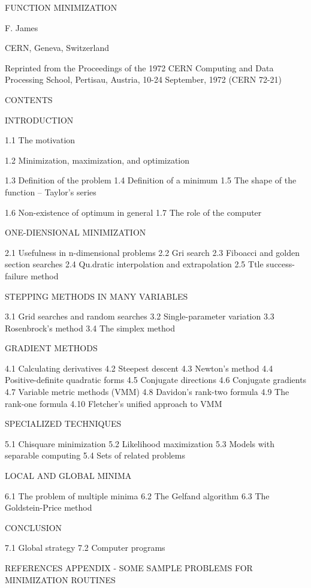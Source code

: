  
                FUNCTION MINIMIZATION
 
 
 
                      F. James
 
              CERN, Geneva, Switzerland
 
 
        Reprinted from the Proceedings of the
   1972 CERN Computing and Data Processing School,
Pertisau, Austria, 10-24 September, 1972 (CERN 72-21)
 
 
                            CONTENTS
 
INTRODUCTION
 
1.1  The motivation
 
1.2  Minimization, maximization,
     and optimization
 
1.3  Definition of the problem
1.4  Definition of a minimum
1.5  The shape of the function --
     Taylor's series
 
1.6  Non-existence of optimum in general
1.7  The role of the computer
 
 
ONE-DIENSIONAL MINIMIZATION
 
2.1  Usefulness in n-dimensional problems
2.2  Gri search
2.3  Fiboacci and golden section searches
2.4  Qu.dratic interpolation and extrapolation
2.5  Ttle success-failure method
 
 
STEPPING METHODS IN MANY VARIABLES
 
3.1  Grid searches and random searches
3.2  Single-parameter variation
3.3  Rosenbrock's method
3.4  The simplex method
 
 
GRADIENT METHODS
 
4.1  Calculating derivatives
4.2  Steepest descent
4.3  Newton's method
4.4  Positive-definite quadratic forms
4.5  Conjugate directions
4.6  Conjugate gradients
4.7   Variable metric methods (VMM)
4.8   Davidon's rank-two formula
4.9   The rank-one formula
4.10  Fletcher's unified approach to VMM
 
 
SPECIALIZED TECHNIQUES
 
5.1   Chisquare minimization
5.2   Likelihood maximization
5.3   Models with separable computing
5.4   Sets of related problems
 
 
LOCAL AND GLOBAL MINIMA
 
6.1   The problem of multiple minima
6.2   The Gelfand algorithm
6.3   The Goldstein-Price method
 
 
CONCLUSION
 
7.1   Global strategy
7.2   Computer programs
 
REFERENCES
APPENDIX - SOME SAMPLE PROBLEMS FOR MINIMIZATION ROUTINES
 
